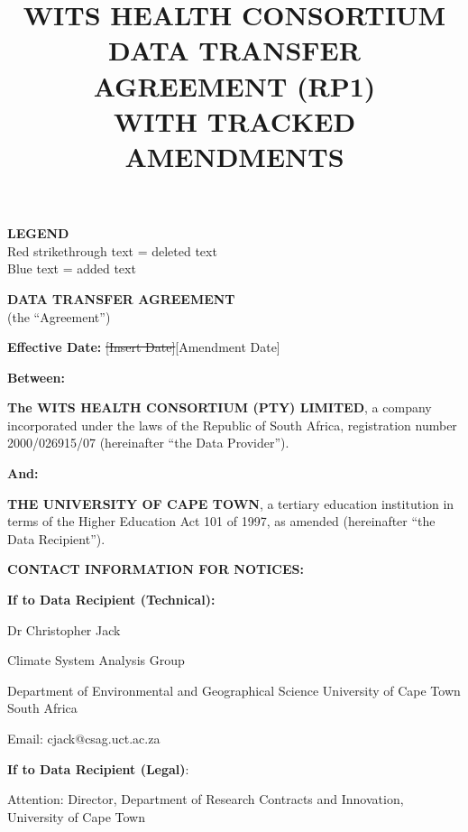 \documentclass[12pt,letterpaper]{article}
\title{\textbf{WITS HEALTH CONSORTIUM\\DATA TRANSFER AGREEMENT (RP1)\\WITH TRACKED AMENDMENTS}}
\author{}
\date{}
\newcommand{\deleted}[1]{\textcolor{deletecolor}{\sout{#1}}}
\newcommand{\added}[1]{\textcolor{addcolor}{#1}}
\begin{document}
\maketitle

\begin{center}
\textbf{LEGEND}\\
\textcolor{deletecolor}{Red strikethrough text} = deleted text\\
\textcolor{addcolor}{Blue text} = added text
\end{center}

\vspace{1cm}

\begin{center}
\textbf{\Large DATA TRANSFER AGREEMENT}\\
\vspace{0.5cm}
(the ``Agreement'')
\end{center}

\vspace{0.5cm}

\textbf{Effective Date:} \deleted{[Insert Date]}\added{[Amendment Date]}

\textbf{Between:}

\textbf{The WITS HEALTH CONSORTIUM (PTY) LIMITED}, a company incorporated under the laws of the Republic of South Africa, registration number 2000/026915/07 (hereinafter ``the Data Provider'').

\vspace{0.2cm}

\textbf{And:}

\textbf{THE UNIVERSITY OF CAPE TOWN}, a tertiary education institution in terms of the Higher Education Act 101 of 1997, as amended (hereinafter ``the Data Recipient'').

\vspace{0.5cm}

\textbf{CONTACT INFORMATION FOR NOTICES:}

\textbf{If to Data Recipient (Technical):}

Dr Christopher Jack

Climate System Analysis Group

Department of Environmental and Geographical Science University of Cape Town South Africa

Email: cjack@csag.uct.ac.za

\textbf{If to Data Recipient (Legal)}:

Attention: Director, Department of Research Contracts and Innovation, University of Cape Town
\end{document}

